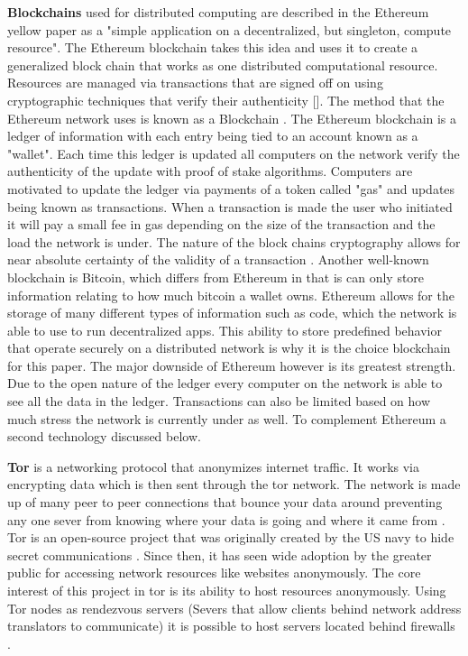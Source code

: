 \documentclass[../main/main.tex]{subfiles}
\begin{document}
\textbf{Blockchains} used for distributed computing are described in the Ethereum yellow paper\cite{ETH} as a "simple application on a decentralized, but singleton, compute resource". 
The Ethereum blockchain takes this idea and uses it to create a generalized block chain that works as one distributed computational resource. 
Resources are managed via transactions that are signed off on using cryptographic techniques that verify their authenticity []. 
The method that the Ethereum network uses is known as a Blockchain \cite{ETH}. 
The Ethereum blockchain is a ledger of information with each entry being tied to an account known as a "wallet". 
Each time this ledger is updated all computers on the network verify the authenticity of the update with proof of stake algorithms. 
Computers are motivated to update the ledger via payments of a token called "gas" \cite{ETH} and updates being known as transactions. 
When a transaction is made the user who initiated it will pay a small fee in gas depending on the size of the transaction and the load the network is under. 
The nature of the block chains cryptography allows for near absolute certainty of the validity of a transaction \cite{ETH}. 
Another well-known blockchain is Bitcoin, which differs from Ethereum in that is can only store information relating to how much bitcoin a wallet owns. 
Ethereum allows for the storage of many different types of information such as code, which the network is able to use to run decentralized apps. 
This ability to store predefined behavior that operate securely on a distributed network is why it is the choice blockchain for this paper. 
The major downside of Ethereum however is its greatest strength. 
Due to the open nature of the ledger every computer on the network is able to see all the data in the ledger. 
Transactions can also be limited based on how much stress the network is currently under as well. 
To complement Ethereum a second technology discussed below.


\textbf{Tor} is a networking protocol that anonymizes internet traffic. 
It works via encrypting data which is then sent through the tor network. 
The network is made up of many peer to peer connections that bounce your data around preventing any one sever from knowing where your data is going and where it came from \cite{TOR}. 
Tor is an open-source project that was originally created by the US navy to hide secret communications \cite{TOR}.
Since then, it has seen wide adoption by the greater public for accessing network resources like websites anonymously. 
The core interest of this project in tor is its ability to host resources anonymously. 
Using Tor nodes as rendezvous servers (Severs that allow clients behind network address translators to communicate) it is possible to host servers located behind firewalls \cite{TOR}. 
\end{document}

